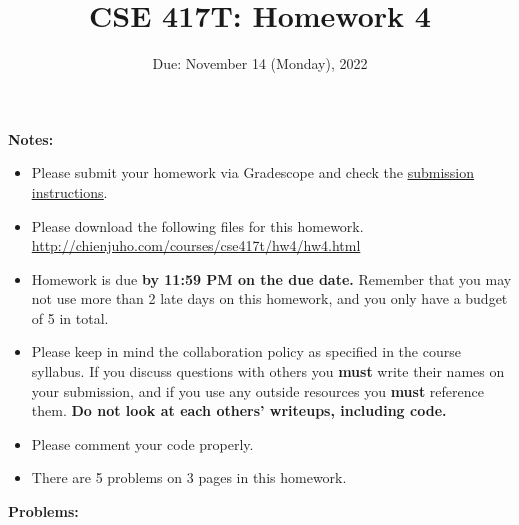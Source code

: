 \documentclass[11pt]{article}
\begin{document}
\title{CSE 417T: Homework 4}
\date{Due: November 14 (Monday), 2022}

\maketitle


\noindent \textbf{Notes: } 
\begin{itemize}

\item Please submit your homework via Gradescope and check the \href{http://chienjuho.com/courses/cse417t/hw_instructions.html}{\underline{submission instructions}}.

\item Please download the following files for this homework.\\
    \url{http://chienjuho.com/courses/cse417t/hw4/hw4.html}

\item Homework is due \textbf{by 11:59 PM on the due date.} Remember that
  you may not use more than 2 late days on this homework, and you
  only have a budget of 5 in total.

\item Please keep in mind the collaboration policy as specified in the
  course syllabus. If you discuss questions with 
others you \textbf{must} write their names on your submission, and if
you use any outside resources you \textbf{must} reference
them. \textbf{Do not look at each others' writeups, including code.}

\item Please comment your code properly.

\item There are 5 problems on 3 pages in this homework. 

\end{itemize}

\noindent \textbf{Problems:}
\end{document}
